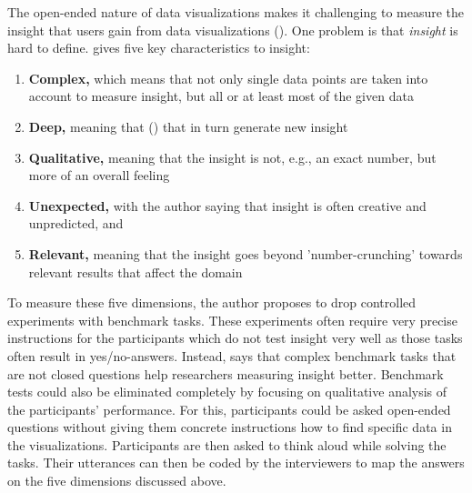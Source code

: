 The open-ended nature of data visualizations makes it challenging to measure the insight that users gain from data visualizations (\cite{northMeasuringVisualizationInsight2006}). One problem is that \emph{insight} is hard to define. \citeauthor{northMeasuringVisualizationInsight2006} gives five key characteristics to insight:
\begin{enumerate}
    \item \textbf{Complex,} which means that not only single data points are taken into account to measure insight, but all or at least most of the given data
    \item \textbf{Deep,} meaning that  (\cite[6]{northMeasuringVisualizationInsight2006}) that in turn generate new insight
    \item \textbf{Qualitative,} meaning that the insight is not, e.g., an exact number, but more of an overall feeling
    \item \textbf{Unexpected,} with the author saying that insight is often creative and unpredicted, and
    \item \textbf{Relevant,} meaning that the insight goes beyond 'number-crunching' towards relevant results that affect the domain
\end{enumerate}
To measure these five dimensions, the author proposes to drop controlled experiments with benchmark tasks. These experiments often require very precise instructions for the participants which do not test insight very well as those tasks often result in yes/no-answers. Instead, \citeauthor{northMeasuringVisualizationInsight2006} says that complex benchmark tasks that are not closed questions help researchers measuring insight better. Benchmark tests could also be eliminated completely by focusing on qualitative analysis of the participants' performance. For this, participants could be asked open-ended questions without giving them concrete instructions how to find specific data in the visualizations. Participants are then asked to think aloud while solving the tasks. Their utterances can then be coded by the interviewers to map the answers on the five dimensions discussed above.
